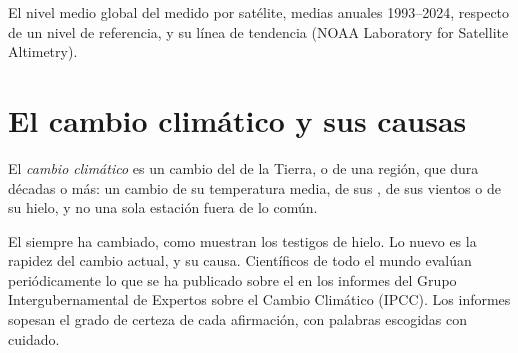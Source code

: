 \begin{omfigure}

{\small El nivel medio global del  medido por satélite, medias anuales
1993--2024, respecto de un nivel de referencia, y su línea de tendencia
(NOAA Laboratory for Satellite Altimetry).}
\label{fig:g9:climate-past-and-present:sea}
\end{omfigure}

\section{El cambio climático y sus causas}

\begin{definition}\label{def:g9:climate-past-and-present:climate-change}
El \emph{cambio climático} es un
cambio del  de la Tierra, o de una región, que dura décadas o más: un
cambio de su temperatura media, de sus , de sus vientos o de su
hielo, y no una sola estación fuera de lo común.
\end{definition}

El  siempre ha cambiado, como muestran los testigos de hielo. Lo
nuevo es la rapidez del cambio actual, y su causa. Científicos de todo el
mundo evalúan periódicamente lo que se ha publicado sobre el  en los
informes del Grupo Intergubernamental de Expertos sobre el Cambio
Climático (IPCC). Los informes sopesan el grado de certeza de cada
afirmación, con palabras escogidas con cuidado.

